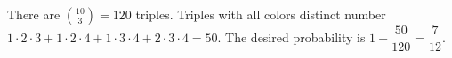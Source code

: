 There are $\binom{10}3=120$ triples. Triples with all colors distinct number $1\cdot2\cdot3+1\cdot2\cdot4+1\cdot3\cdot4+2\cdot3\cdot4=50$. The desired probability is $1-\dfrac{50}{120}=\boxed{\dfrac{7}{12}}$.
